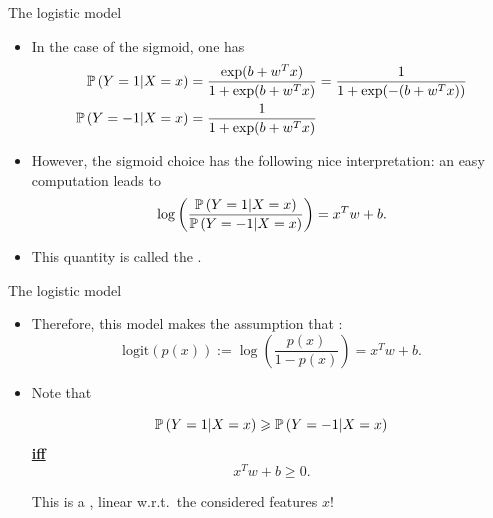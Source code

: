 \documentclass[xcolor={usenames,dvipsnames},handout]{beamer}
\begin{document}
\begin{frame}{The logistic model}

\begin{itemize}
\item In the case of the sigmoid,
one has
\begin{align*}
\P\left(  Y = 1 | X =x \right) &= \frac{\exp (b+ w^Tx)}{1+ \exp(b+ w^T x)} = \frac{1}{1+\exp(-(b+ w^T x)) } \\
\P\left(  Y = - 1 | X =x \right) &=  \frac{1}{1+\exp(b+ w^T x) }
\end{align*}

\item However, the sigmoid choice has the following nice interpretation: an easy computation leads to
$$
\log \left( \frac{\P\left(  Y = 1 | X =x \right)}{\P\left(  Y = -1 | X =x \right)} \right) = x^T w +b.
$$
\item This quantity is called the .
\end{itemize}
\end{frame}

\begin{frame}{The logistic model}

\begin{itemize}
\item Therefore, this model makes the assumption that :
$$
\mathrm{logit} (p(x)) := \log\left( \frac{p(x)}{1-p(x)} \right) = x^T w + b.
$$
\pause
\item Note that 
\begin{block}{}
$$
\P\left(  Y = 1 | X =x \right) \geq \P\left(  Y = -1 | X =x \right)
$$
\underline{\textbf{iff}}
$$
x^Tw + b \geq 0.
$$
\end{block}
\pause
This is a , linear w.r.t.\ the considered features $x$!
\end{itemize}
\end{frame}
\end{document}
